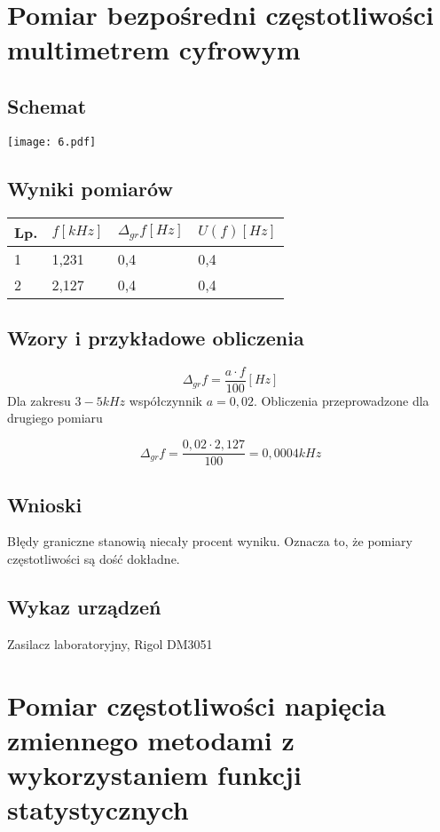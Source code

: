\documentclass[11pt]{article}
\begin{document}
\section{Pomiar bezpośredni częstotliwości multimetrem cyfrowym}
\subsection{Schemat}

\begin{center}
\texttt{[image: 6.pdf]}
\end{center}

\subsection{Wyniki pomiarów}

\begin{center}
\begin{tabular}{|l|l|l|l|}
\hline
	Lp. & $f[kHz]$ & $\Delta_{gr}f[Hz]$ & $U(f)[Hz]$\\
\hline
	1 & 1,231  & 0,4& 0,4\\
\hline
	2 & 2,127 & 0,4 & 0,4\\
\hline
\end{tabular}
\end{center}

\subsection{Wzory i przykładowe obliczenia}
$$ \Delta_{gr}f = \frac{a \cdot f}{100} [Hz] $$
Dla zakresu $3 - 5 kHz$ współczynnik $a = 0,02$. 
Obliczenia przeprowadzone dla drugiego pomiaru

$$ \Delta_{gr}f = \frac{0,02 \cdot 2,127}{100} = 0,0004  kHz$$   

\subsection{Wnioski}
Błędy graniczne stanowią niecały procent wyniku. Oznacza to, że pomiary częstotliwości są dość dokładne.
\subsection{Wykaz urządzeń}
Zasilacz laboratoryjny, Rigol DM3051

\newpage
\section{Pomiar częstotliwości napięcia zmiennego metodami z wykorzystaniem funkcji statystycznych}
\end{document}
